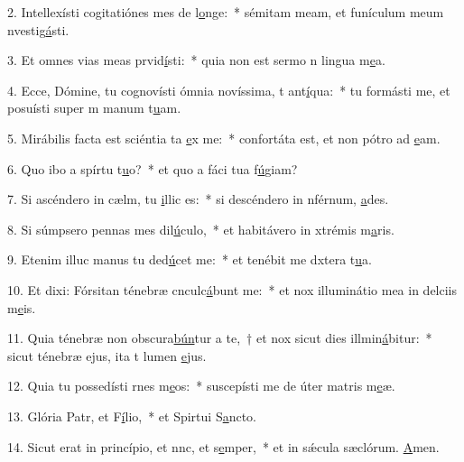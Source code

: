 2. Intellexísti cogitatiónes mes de l\uline{o}nge:~* sémitam meam, et funículum meum nvestig\uline{á}sti.\par 
3. Et omnes vias meas prvid\uline{í}sti:~* quia non est sermo n lingua m\uline{e}a.\par 
4. Ecce, Dómine, tu cognovísti ómnia novíssima, t ant\uline{í}qua:~* tu formásti me, et posuísti super m manum t\uline{u}am.\par 
5. Mirábilis facta est sciéntia ta \uline{e}x me:~* confortáta est, et non pótro ad \uline{e}am.\par 
6. Quo ibo a spírtu t\uline{u}o?~* et quo a fáci tua f\uline{ú}giam?\par 
7. Si ascéndero in cælm, tu \uline{i}llic es:~* si descéndero in nférnum, \uline{a}des.\par 
8. Si súmpsero pennas mes dil\uline{ú}culo,~* et habitávero in xtrémis m\uline{a}ris.\par 
9. Etenim illuc manus tu ded\uline{ú}cet me:~* et tenébit me dxtera t\uline{u}a.\par 
10. Et dixi: Fórsitan ténebræ cnculc\uline{á}bunt me:~* et nox illuminátio mea in delciis m\uline{e}is.\par 
11. Quia ténebræ non obscura\uline{bún}tur a te,~† et nox sicut dies illmin\uline{á}bitur:~* sicut ténebræ ejus, ita t lumen \uline{e}jus.\par 
12. Quia tu possedísti rnes m\uline{e}os:~* suscepísti me de úter matris m\uline{e}æ.\par 
13. Glória Patr, et F\uline{í}lio,~* et Spirtui S\uline{a}ncto.\par 
14. Sicut erat in princípio, et nnc, et s\uline{e}mper,~* et in sǽcula sæclórum. \uline{A}men.\par 
